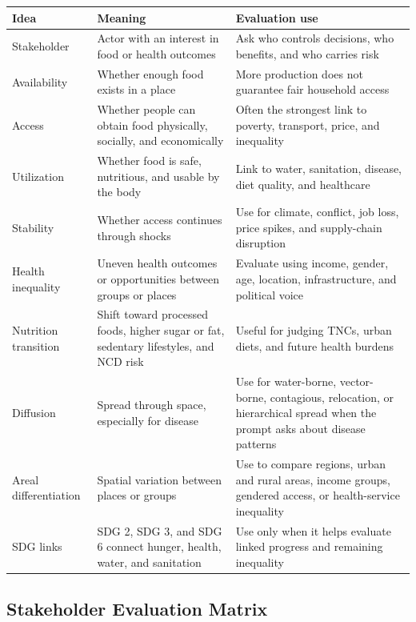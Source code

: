 \documentclass[11pt,a4paper]{article}
\begin{document}
\begin{tabularx}{\textwidth}{L{0.23\textwidth}Y Y}
\toprule
\textbf{Idea} & \textbf{Meaning} & \textbf{Evaluation use} \\
\midrule
Stakeholder & Actor with an interest in food or health outcomes & Ask who
controls decisions, who benefits, and who carries risk \\
Availability & Whether enough food exists in a place & More production does
not guarantee fair household access \\
Access & Whether people can obtain food physically, socially, and economically
& Often the strongest link to poverty, transport, price, and inequality \\
Utilization & Whether food is safe, nutritious, and usable by the body & Link
to water, sanitation, disease, diet quality, and healthcare \\
Stability & Whether access continues through shocks & Use for climate, conflict,
job loss, price spikes, and supply-chain disruption \\
Health inequality & Uneven health outcomes or opportunities between groups or
places & Evaluate using income, gender, age, location, infrastructure, and
political voice \\
Nutrition transition & Shift toward processed foods, higher sugar or fat,
sedentary lifestyles, and NCD risk & Useful for judging TNCs, urban diets, and
future health burdens \\
Diffusion & Spread through space, especially for disease & Use for water-borne,
vector-borne, contagious, relocation, or hierarchical spread when the prompt
asks about disease patterns \\
Areal differentiation & Spatial variation between places or groups & Use to
compare regions, urban and rural areas, income groups, gendered access, or
health-service inequality \\
SDG links & SDG 2, SDG 3, and SDG 6 connect hunger, health, water, and
sanitation & Use only when it helps evaluate linked progress and remaining
inequality \\
\bottomrule
\end{tabularx}

\subsection{Stakeholder Evaluation Matrix}
\end{document}
